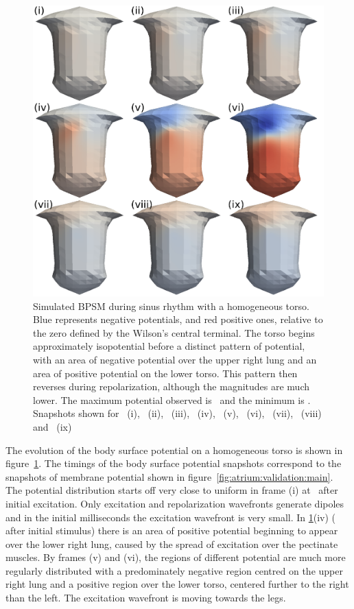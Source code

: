 \begin{figure}
\includegraphics{figures/bsp/bsp_torso}
\caption[Body Surface Potential snapshots, homogeneous torso]{
\label{bsp:fig:homo_bsp}
Simulated BPSM during sinus rhythm with a homogeneous
torso.
Blue represents negative potentials, and red positive ones, relative to the zero
defined by the Wilson's central terminal.
The torso begins approximately isopotential before a distinct pattern of
potential, with an area of negative potential over the upper right lung and an
area of positive potential on the lower torso.
This pattern then reverses during repolarization, although the magnitudes are
much lower.
The maximum potential observed is \ and the minimum is .
Snapshots shown for \ (i), \ (ii), \ (iii), \ (iv),
\ (v), \ (vi), \ (vii), \ (viii) and \
(ix)
}
\end{figure}

The evolution of the body surface potential on a homogeneous torso is shown in
figure~\ref{bsp:fig:homo_bsp}.
The timings of the body surface potential snapshots correspond to the snapshots
of membrane potential shown in figure~\ref{fig:atrium:validation:main}.
The potential distribution starts off very close to uniform in frame (i) at
\ms{10}\ after initial excitation.
Only excitation and repolarization wavefronts generate dipoles and in the
initial milliseconds the excitation wavefront is very small.
In \ref{bsp:fig:homo_bsp}(iv) ( after initial stimulus) there is an area
of positive potential beginning to appear over the lower right lung, caused by
the spread of excitation over the pectinate muscles.
By frames (v) and (vi), the regions of different potential are much more
regularly distributed with a predominately negative region centred on the upper
right lung and a positive region over the lower torso, centered further to the
right than the left.
The excitation wavefront is moving towards the legs.

